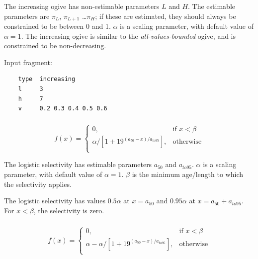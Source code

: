 The increasing ogive has non-estimable parameters $L$ and $H$. The estimable parameters are $\pi_L$, $\pi_{L+1}$ \ldots $\pi_H$; if these are estimated, they should always be constrained to be between 0 and 1. $\alpha$ is a scaling parameter, with default value of $\alpha = 1$. The increasing ogive is similar to the \textit{all-values-bounded} ogive, and is constrained to be non-decreasing.

Input fragment: 
{\small{\begin{verbatim}
	type  increasing
	l     3
	h     7
	v     0.2 0.3 0.4 0.5 0.6
\end{verbatim}}}

\subsubsection[Logistic]{}  \label{sec:Selectivity-Logistic}

\begin{equation}
  f(x) = \begin{cases}
  	0, & \text{if $x < \beta$} \\
   \alpha / [1+19^{(a_{50}-x)/a_{to95}}], & \text{otherwise} \\
   \end{cases}
\end{equation}

The logistic selectivity has estimable parameters $a_{50}$ and $a_{to95}$. $\alpha$ is a scaling parameter, with default value of $\alpha = 1$. $\beta$ is the minimum age/length to which the selectivity applies. 

The logistic selectivity has values $0.5 \alpha$ at $x=a_{50}$ and $0.95 \alpha$ at $x=a_{50}+a_{to95}$. For $x < \beta$, the selectivity is zero.

\subsubsection[Inverse logistic]{}  \label{sec:Selectivity-InverseLogistic} 

\begin{equation}
  f(x) = \begin{cases}
	0, & \text{if $x < \beta$} \\
    \alpha - \alpha / [1+19^{(a_{50}-x)/a_{to95}}], & \text{otherwise} \\
   \end{cases}
\end{equation}

